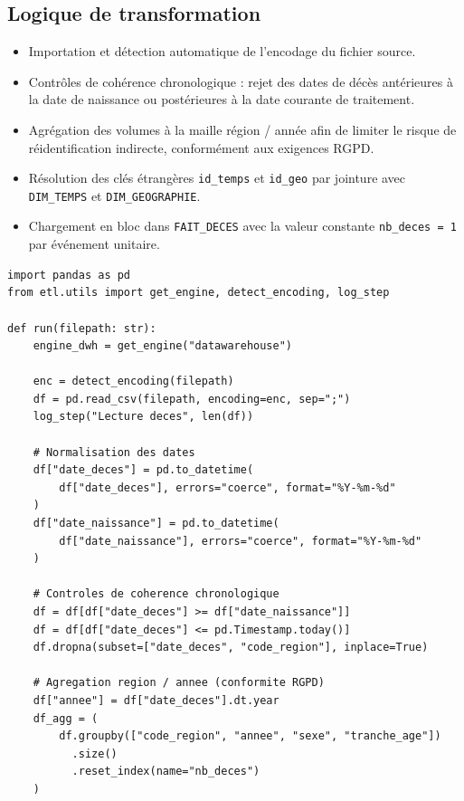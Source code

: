 \documentclass[12pt, a4paper]{report}
\begin{document}
\begin{itemize}[label=\textcolor{chuBlue}{\textbullet}]
\subsection{Logique de transformation}

\begin{itemize}[label=\textcolor{chuBlue}{\textbullet}]
  \item Importation et détection automatique de l'encodage du fichier source.
  \item Contrôles de cohérence chronologique : rejet des dates de décès antérieures à la date de naissance ou postérieures à la date courante de traitement.
  \item Agrégation des volumes à la maille région / année afin de limiter le risque de réidentification indirecte, conformément aux exigences RGPD.
  \item Résolution des clés étrangères \texttt{id\_temps} et \texttt{id\_geo} par jointure avec \texttt{DIM\_TEMPS} et \texttt{DIM\_GEOGRAPHIE}.
  \item Chargement en bloc dans \texttt{FAIT\_DECES} avec la valeur constante \texttt{nb\_deces = 1} par événement unitaire.
\end{itemize}

\begin{lstlisting}[style=python, caption={Job 4 -- traitement et chargement des registres de décès}, label={lst:job4}]
import pandas as pd
from etl.utils import get_engine, detect_encoding, log_step

def run(filepath: str):
    engine_dwh = get_engine("datawarehouse")

    enc = detect_encoding(filepath)
    df = pd.read_csv(filepath, encoding=enc, sep=";")
    log_step("Lecture deces", len(df))

    # Normalisation des dates
    df["date_deces"] = pd.to_datetime(
        df["date_deces"], errors="coerce", format="%Y-%m-%d"
    )
    df["date_naissance"] = pd.to_datetime(
        df["date_naissance"], errors="coerce", format="%Y-%m-%d"
    )

    # Controles de coherence chronologique
    df = df[df["date_deces"] >= df["date_naissance"]]
    df = df[df["date_deces"] <= pd.Timestamp.today()]
    df.dropna(subset=["date_deces", "code_region"], inplace=True)

    # Agregation region / annee (conformite RGPD)
    df["annee"] = df["date_deces"].dt.year
    df_agg = (
        df.groupby(["code_region", "annee", "sexe", "tranche_age"])
          .size()
          .reset_index(name="nb_deces")
    )


\end{lstlisting}
\end{itemize}
\end{document}
